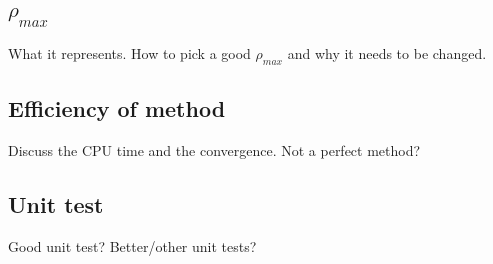 \subsection{$\rho_{max}$}
What it represents. How to pick a good $\rho_{max}$ and why it needs to be changed.

\subsection{Efficiency of method}

Discuss the CPU time and the convergence. Not a perfect method?

\subsection{Unit test}

Good unit test? Better/other unit tests?

